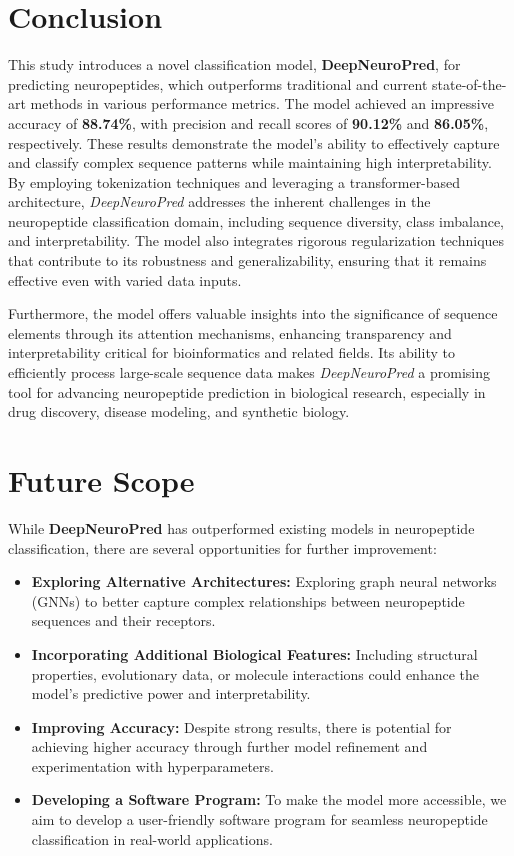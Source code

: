 \documentclass[conference]{IEEEtran}
\begin{document}
\section{Conclusion}
This study introduces a novel classification model, \textbf{DeepNeuroPred}, for predicting neuropeptides, which outperforms traditional and current state-of-the-art methods in various performance metrics. The model achieved an impressive accuracy of \textbf{88.74\%}, with precision and recall scores of \textbf{90.12\%} and \textbf{86.05\%}, respectively. These results demonstrate the model's ability to effectively capture and classify complex sequence patterns while maintaining high interpretability. By employing tokenization techniques and leveraging a transformer-based architecture, \textit{DeepNeuroPred} addresses the inherent challenges in the neuropeptide classification domain, including sequence diversity, class imbalance, and interpretability. The model also integrates rigorous regularization techniques that contribute to its robustness and generalizability, ensuring that it remains effective even with varied data inputs.

Furthermore, the model offers valuable insights into the significance of sequence elements through its attention mechanisms, enhancing transparency and interpretability critical for bioinformatics and related fields. Its ability to efficiently process large-scale sequence data makes \textit{DeepNeuroPred} a promising tool for advancing neuropeptide prediction in biological research, especially in drug discovery, disease modeling, and synthetic biology.

\section{Future Scope}
While \textbf{DeepNeuroPred} has outperformed existing models in neuropeptide classification, there are several opportunities for further improvement:

\begin{itemize}
    \item \textbf{Exploring Alternative Architectures:} Exploring graph neural networks (GNNs) to better capture complex relationships between neuropeptide sequences and their receptors.
    
    \item \textbf{Incorporating Additional Biological Features:} Including structural properties, evolutionary data, or molecule interactions could enhance the model’s predictive power and interpretability.
    
    \item \textbf{Improving Accuracy:} Despite strong results, there is potential for achieving higher accuracy through further model refinement and experimentation with hyperparameters.
    
    \item \textbf{Developing a Software Program:} To make the model more accessible, we aim to develop a user-friendly software program for seamless neuropeptide classification in real-world applications.
\end{itemize}
\end{document}
